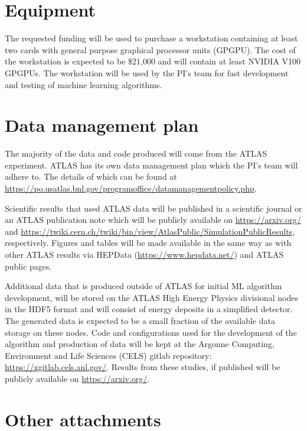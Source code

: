 \documentclass[letter, USenglish, 11pt, subfigure]{article}
\begin{document}
\clearpage

\section{Equipment}
The requested funding will be used to purchase a workstation containing at least two cards with general purpose graphical processor units (GPGPU). The cost of the workstation is expected to be  \$21,000 and will contain at least NVIDIA V100 GPGPUs. The workstation will be used by the PI's team for fast development and testing of machine learning algorithms. 
\clearpage

\section{Data management plan}
The majority of the data and code produced will come from the ATLAS experiment. ATLAS has its own data management plan which the PI's team will adhere to. The details of which can be found at \url{https://po.usatlas.bnl.gov/programoffice/datamanagementpolicy.php}.

Scientific results that used ATLAS data will be published in a scientific journal or an ATLAS publication note which will be publicly available on \url{https://arxiv.org/} and \url{https://twiki.cern.ch/twiki/bin/view/AtlasPublic/SimulationPublicResults}, respectively. Figures and tables will be made available in the same way as with other ATLAS results via HEPData (\url{https://www.hepdata.net/}) and ATLAS public pages. 

Additional data that is produced outside of ATLAS for initial ML algorithm development, will be stored on the ATLAS High Energy Physics divisional nodes in the HDF5 format and will consist of energy deposits in a simplified detector. The generated data is expected to be a small fraction of the available data storage on these nodes. Code and configurations used for the development of the algorithm and production of data will be kept at the Argonne Computing, Environment and Life Sciences (CELS) gitlab repository: \url{https://xgitlab.cels.anl.gov/}. Results from these studies, if published will be publicly available on \url{https://arxiv.org/}. 

\clearpage

\section{Other attachments}
\end{document}
